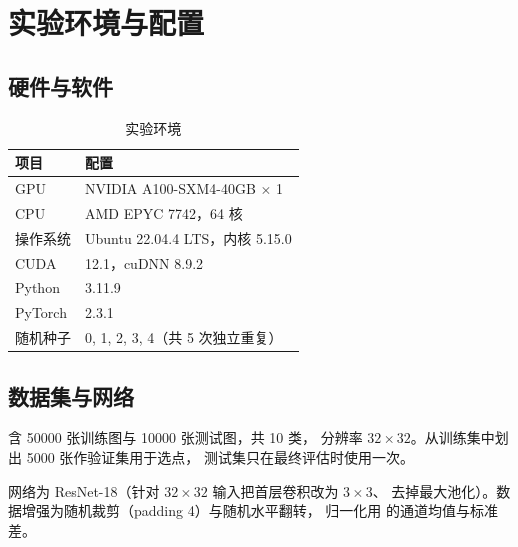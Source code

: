 \section{实验环境与配置}
\label{sec:setup}

\subsection{硬件与软件}
\label{sec:setup:env}

\begin{table}[htbp]
  \centering
  \caption{实验环境}
  \label{tab:env}
  \begin{tabular}{ll}
    \toprule
    {项目} & {配置} \\
    \midrule
    GPU        & NVIDIA A100-SXM4-40GB $\times$ 1 \\
    CPU        & AMD EPYC 7742，64 核 \\
    操作系统   & Ubuntu 22.04.4 LTS，内核 5.15.0 \\
    CUDA       & 12.1，cuDNN 8.9.2 \\
    Python     & 3.11.9 \\
    PyTorch    & 2.3.1 \\
    随机种子   & 0, 1, 2, 3, 4（共 5 次独立重复） \\
    \bottomrule
  \end{tabular}
\end{table}

\subsection{数据集与网络}
\label{sec:setup:data}

\dataset{} 含 \num{50000} 张训练图与 \num{10000} 张测试图，共 10 类，
分辨率 $32 \times 32$。从训练集中划出 \num{5000} 张作验证集用于选点，
测试集只在最终评估时使用一次。

网络为 ResNet-18（针对 $32\times32$ 输入把首层卷积改为 $3\times3$、
去掉最大池化）。数据增强为随机裁剪（padding \qty{4}{\pixel}）与随机水平翻转，
归一化用 \dataset{} 的通道均值与标准差。

